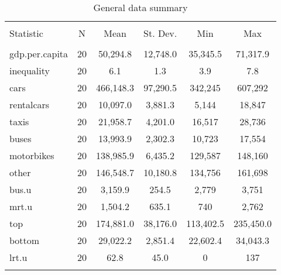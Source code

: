 
\begin{table}[!htbp] \centering 
  \caption{General data summary} 
  \label{labels1} 
\begin{tabular}{@{\extracolsep{5pt}}lccccc} 
\\[-1.8ex]\hline 
\hline \\[-1.8ex] 
Statistic & \multicolumn{1}{c}{N} & \multicolumn{1}{c}{Mean} & \multicolumn{1}{c}{St. Dev.} & \multicolumn{1}{c}{Min} & \multicolumn{1}{c}{Max} \\ 
\hline \\[-1.8ex] 
gdp.per.capita & 20 & 50,294.8 & 12,748.0 & 35,345.5 & 71,317.9 \\ 
inequality & 20 & 6.1 & 1.3 & 3.9 & 7.8 \\ 
cars & 20 & 466,148.3 & 97,290.5 & 342,245 & 607,292 \\ 
rentalcars & 20 & 10,097.0 & 3,881.3 & 5,144 & 18,847 \\ 
taxis & 20 & 21,958.7 & 4,201.0 & 16,517 & 28,736 \\ 
buses & 20 & 13,993.9 & 2,302.3 & 10,723 & 17,554 \\ 
motorbikes & 20 & 138,985.9 & 6,435.2 & 129,587 & 148,160 \\ 
other & 20 & 146,548.7 & 10,180.8 & 134,756 & 161,698 \\ 
bus.u & 20 & 3,159.9 & 254.5 & 2,779 & 3,751 \\ 
mrt.u & 20 & 1,504.2 & 635.1 & 740 & 2,762 \\ 
top & 20 & 174,881.0 & 38,176.0 & 113,402.5 & 235,450.0 \\ 
bottom & 20 & 29,022.2 & 2,851.4 & 22,602.4 & 34,043.3 \\ 
lrt.u & 20 & 62.8 & 45.0 & 0 & 137 \\ 
\hline \\[-1.8ex] 
\end{tabular} 
\end{table} 
